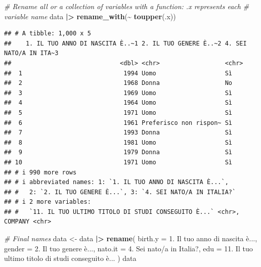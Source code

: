 \documentclass[
]{book}
\newenvironment{Shaded}{\begin{snugshade}}{\end{snugshade}}
\newcommand{\AttributeTok}[1]{\textcolor[rgb]{0.13,0.29,0.53}{#1}}
\newcommand{\CommentTok}[1]{\textcolor[rgb]{0.56,0.35,0.01}{\textit{#1}}}
\newcommand{\FunctionTok}[1]{\textcolor[rgb]{0.13,0.29,0.53}{\textbf{#1}}}
\newcommand{\NormalTok}[1]{#1}
\newcommand{\OtherTok}[1]{\textcolor[rgb]{0.56,0.35,0.01}{#1}}
\newcommand{\SpecialCharTok}[1]{\textcolor[rgb]{0.81,0.36,0.00}{\textbf{#1}}}
\newcommand{\StringTok}[1]{\textcolor[rgb]{0.31,0.60,0.02}{#1}}
\begin{document}
\begin{Shaded}
\begin{Highlighting}[]
\CommentTok{\# Rename all or a collection of variables with a function: .x represents each}
\CommentTok{\# variable name}
\NormalTok{data }\SpecialCharTok{|\textgreater{}} 
  \FunctionTok{rename\_with}\NormalTok{(}\SpecialCharTok{\textasciitilde{}} \FunctionTok{toupper}\NormalTok{(.x))}
\end{Highlighting}
\end{Shaded}

\begin{verbatim}
## # A tibble: 1,000 x 5
##    1. IL TUO ANNO DI NASCITA È..~1 2. IL TUO GENERE È..~2 4. SEI NATO/A IN ITA~3
##                              <dbl> <chr>                  <chr>                 
##  1                            1994 Uomo                   Sì                    
##  2                            1968 Donna                  No                    
##  3                            1969 Uomo                   Sì                    
##  4                            1964 Uomo                   Sì                    
##  5                            1971 Uomo                   Sì                    
##  6                            1961 Preferisco non rispon~ Sì                    
##  7                            1993 Donna                  Sì                    
##  8                            1981 Uomo                   Sì                    
##  9                            1979 Donna                  Sì                    
## 10                            1971 Uomo                   Sì                    
## # i 990 more rows
## # i abbreviated names: 1: `1. IL TUO ANNO DI NASCITA È...`,
## #   2: `2. IL TUO GENERE È...`, 3: `4. SEI NATO/A IN ITALIA?`
## # i 2 more variables:
## #   `11. IL TUO ULTIMO TITOLO DI STUDI CONSEGUITO È...` <chr>, COMPANY <chr>
\end{verbatim}

\begin{Shaded}
\begin{Highlighting}[]
\CommentTok{\# Final names }
\NormalTok{data }\OtherTok{\textless{}{-}}\NormalTok{ data }\SpecialCharTok{|\textgreater{}} 
  \FunctionTok{rename}\NormalTok{(}
    \AttributeTok{birth.y =} \StringTok{\textasciigrave{}}\AttributeTok{1. Il tuo anno di nascita è...}\StringTok{\textasciigrave{}}\NormalTok{,}
    \AttributeTok{gender =} \StringTok{\textasciigrave{}}\AttributeTok{2. Il tuo genere è...}\StringTok{\textasciigrave{}}\NormalTok{,}
    \AttributeTok{nato.it =} \StringTok{\textasciigrave{}}\AttributeTok{4. Sei nato/a in Italia?}\StringTok{\textasciigrave{}}\NormalTok{,}
    \AttributeTok{edu =} \StringTok{\textasciigrave{}}\AttributeTok{11. Il tuo ultimo titolo di studi conseguito è...}\StringTok{\textasciigrave{}}
\NormalTok{  )}
\NormalTok{data}
\end{Highlighting}
\end{Shaded}
\end{document}
